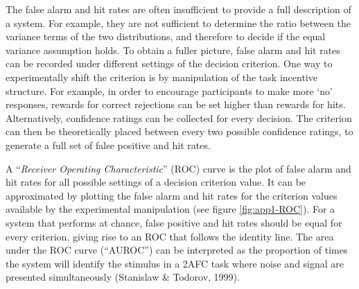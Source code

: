 \documentclass[12pt,twoside]{reedthesis}
\begin{document}
The false alarm and hit rates are often insufficient to provide a full description of a system. For example, they are not sufficient to determine the ratio between the variance terms of the two distributions, and therefore to decide if the equal variance assumption holds. To obtain a fuller picture, false alarm and hit rates can be recorded under different settings of the decision criterion. One way to experimentally shift the criterion is by manipulation of the task incentive structure. For example, in order to encourage participants to make more `no' responses, rewards for correct rejections can be set higher than rewards for hits. Alternatively, confidence ratings can be collected for every decision. The criterion can then be theoretically placed between every two possible confidence ratings, to generate a full set of false positive and hit rates.

A ``\emph{Receiver Operating Characteristic}'' (ROC) curve is the plot of false alarm and hit rates for all possible settings of a decision criterion value. It can be approximated by plotting the false alarm and hit rates for the criterion values available by the experimental manipulation (see figure \ref{fig:app1-ROC}). For a system that performs at chance, false positive and hit rates should be equal for every criterion, giving rise to an ROC that follows the identity line. The area under the ROC curve (``AUROC'') can be interpreted as the proportion of times the system will identify the stimulus in a 2AFC task where noise and signal are presented simultaneously (Stanislaw \& Todorov, 1999).
\end{document}
